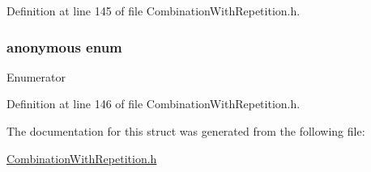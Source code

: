 Definition at line 145 of file Combination\+With\+Repetition.\+h.

\hypertarget{structmodel_1_1_combination_with_repetition_3_011_00_010_01_4_a5d969386fa7719bb8077444d429e3f28}{}\subsubsection[{anonymous enum}]{\setlength{\rightskip}{0pt plus 5cm}anonymous enum}\label{structmodel_1_1_combination_with_repetition_3_011_00_010_01_4_a5d969386fa7719bb8077444d429e3f28}
\begin{Desc}
\item[Enumerator]\par
\begin{description}
\item[{\em 
\hypertarget{structmodel_1_1_combination_with_repetition_3_011_00_010_01_4_a5d969386fa7719bb8077444d429e3f28a912fc8866193157c5c5d9a5754f7f426}{}value\label{structmodel_1_1_combination_with_repetition_3_011_00_010_01_4_a5d969386fa7719bb8077444d429e3f28a912fc8866193157c5c5d9a5754f7f426}
}]\end{description}
\end{Desc}


Definition at line 146 of file Combination\+With\+Repetition.\+h.



The documentation for this struct was generated from the following file\+:\begin{DoxyCompactItemize}
\item 
\hyperlink{_combination_with_repetition_8h}{Combination\+With\+Repetition.\+h}\end{DoxyCompactItemize}
